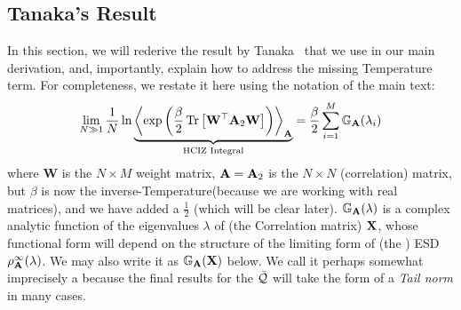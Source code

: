 \subsection{Tanaka's Result}
\label{sxn:tanaka}

In this section, we will rederive the result by Tanaka~\cite{Tanaka2007,Tanaka2008} that we use in our main derivation,
and, importantly, explain how to address the missing Temperature term.
For completeness, we restate it here using the notation of the main text:
\begin{equation}
  \label{eqn:hciz}
  \lim_{N \gg 1} \frac{1}{N} \ln 
\underbrace{
  \Expected[\mathbf{\AMAT}]{
    \exp\left(\frac{\beta}{2}
    \Trace{\mathbf{W}^{\top} \AMAT_{2} \mathbf{W}}
    \right)
  }
 }_{\text{HCIZ Integral}}
  = \frac{\beta}{2} \sum_{i=1}^{M} \GNORM(\lambda_{i})
\end{equation}
where 
$\mathbf{W}$ is the $N\times M$ \Teacher weight matrix, 
$\mathbf{A}=\mathbf{A}_{2}$ is the $N\times N$ \Student (correlation) matrix, 
but $\beta$ is now the inverse-Temperature(because we are working with real matrices),
and we have added a $\tfrac{1}{2}$ (which will be clear later).
$\mathbb{G}_{\mathbf{A}}(\lambda)$ is a complex analytic function of the eigenvalues $\lambda$ of (the \Teacher Correlation matrix) $\mathbf{X}$, 
whose functional form will depend on the structure of the limiting form of (the \Student) ESD $\rho_{\mathbf{A}}^{\infty}(\lambda)$.
We may also write it as $\mathbb{G}_{\mathbf{A}}(\mathbf{X})$ below.
We call it perhaps somewhat imprecisely a  \emph{\red{\GEN}} because the final results for the \LayerQuality  $\bar{\mathcal{Q}}$ will take the form of a \emph{Tail norm} in many cases.


